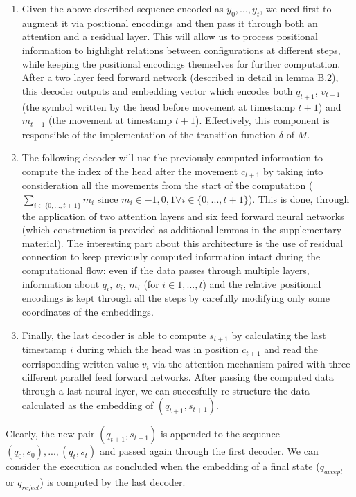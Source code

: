 \documentclass{article}
\begin{document}
\begin{enumerate}
    \item Given the above described sequence encoded as $y_0,...,y_t$, we need first to augment it via positional encodings and then pass it through both an attention and a residual layer. This will allow us to process positional information to highlight relations between configurations at different steps, while keeping the positional encodings themselves for further computation. After a two layer feed forward network (described in detail in lemma B.2), this decoder outputs and embedding vector which encodes both $q_{t+1}$, $v_{t+1}$ (the symbol written by the head before movement at timestamp $t+1$) and $m_{t+1}$ (the movement at timestamp $t+1$). Effectively, this component is responsible of the implementation of the transition function $\delta$ of $M$.
    \item The following decoder will use the previously computed information to compute the index of the head after the movement $c_{t+1}$ by taking into consideration all the movements from the start of the computation ($\sum_{i \in \{0,...,t+1\}}m_i$ since $m_i \in {-1,0,1} \forall i \in \{0,...,t+1\}$). This is done, through the application of two attention layers and six feed forward neural networks (which construction is provided as additional lemmas in the supplementary material). The interesting part about this architecture is the use of residual connection to keep previously computed information intact during the computational flow: even if the data passes through multiple layers, information about $q_i$, $v_i$, $m_i$ (for $i \in {1,...,t}$) and the relative positional encodings is kept through all the steps by carefully modifying only some coordinates of the embeddings.
    \item Finally, the last decoder is able to compute $s_{t+1}$ by calculating the last timestamp $i$ during which the head was in position $c_{t+1}$ and read the corrisponding written value $v_i$ via the attention mechanism paired with three different parallel feed forward networks. After passing the computed data through a last neural layer, we can succesfully re-structure the data calculated as the embedding of $(q_{t+1},s_{t+1})$.
\end{enumerate}

Clearly, the new pair $(q_{t+1},s_{t+1})$ is appended to the sequence $(q_0,s_0),...,(q_t,s_t)$ and passed again through the first decoder. We can consider the execution as concluded when the embedding of a final state ($q_{accept}$ or $q_{reject}$) is computed by the last decoder.
\end{document}
